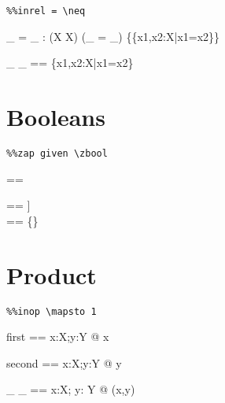 \documentclass{article}
\begin{document}
\begin{verbatim}
%%inrel = \neq
\end{verbatim}

\begin{axdef}[X]
  \_ = \_ : \assumed \power (X \cross X)
\where
  (\_ = \_) \in \{\{x1,x2:X|x1=x2\}\} 
\end{axdef}

\begin{axdef}[X]
  \_ \neq \_ == \{x1,x2:\assumed X|\lnot x1=x2\} 
\end{axdef}


\section{Booleans}

\begin{verbatim}
%%zap given \zbool
\end{verbatim}

\begin{zed}
  \zbool == \power []
\end{zed}

\begin{zed}
  \zfalse == \emptyset[[]] \\
  \ztrue == \{\lbind\rbind\}
\end{zed}



\section{Product}

\begin{verbatim}
%%inop \mapsto 1
\end{verbatim}

\begin{axdef}[X,Y]
   first == \lambda x:\assumed X;y:\assumed Y  @ x
\end{axdef}
\begin{axdef}[X,Y]
   second == \lambda x:\assumed X;y:\assumed Y @ y
\end{axdef}
\begin{axdef}[X,Y]
   \_ \mapsto \_ == \lambda x:\assumed X; y: \assumed Y @ (x,y)
\end{axdef}

\end{document}
